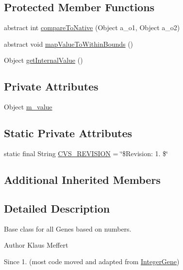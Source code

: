 \subsection*{Protected Member Functions}
\begin{DoxyCompactItemize}
\item 
abstract int \hyperlink{classorg_1_1jgap_1_1impl_1_1_number_gene_ad43d0cc91b4458f407085e30aaf6ce3e}{compare\-To\-Native} (Object a\-\_\-o1, Object a\-\_\-o2)
\item 
abstract void \hyperlink{classorg_1_1jgap_1_1impl_1_1_number_gene_abecc7e11d15220180de70184adbca1dd}{map\-Value\-To\-Within\-Bounds} ()
\item 
Object \hyperlink{classorg_1_1jgap_1_1impl_1_1_number_gene_a123a17deb1c4d63e97ade4ec25e2917f}{get\-Internal\-Value} ()
\end{DoxyCompactItemize}
\subsection*{Private Attributes}
\begin{DoxyCompactItemize}
\item 
Object \hyperlink{classorg_1_1jgap_1_1impl_1_1_number_gene_aa8ff97bc401fc5729f2164d91c8c080f}{m\-\_\-value}
\end{DoxyCompactItemize}
\subsection*{Static Private Attributes}
\begin{DoxyCompactItemize}
\item 
static final String \hyperlink{classorg_1_1jgap_1_1impl_1_1_number_gene_a02c4c0f2278e7fc5119beef02806271f}{C\-V\-S\-\_\-\-R\-E\-V\-I\-S\-I\-O\-N} = \char`\"{}\$Revision\-: 1. \$\char`\"{}
\end{DoxyCompactItemize}
\subsection*{Additional Inherited Members}


\subsection{Detailed Description}
Base class for all Genes based on numbers.

\begin{DoxyAuthor}{Author}
Klaus Meffert 
\end{DoxyAuthor}
\begin{DoxySince}{Since}
1. (most code moved and adapted from \hyperlink{classorg_1_1jgap_1_1impl_1_1_integer_gene}{Integer\-Gene}) 
\end{DoxySince}


